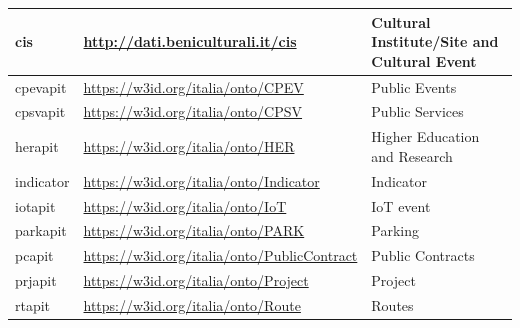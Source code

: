\begin{longtable}[c]{lll}
  \multicolumn{1}{|p{0.2\textwidth}|}{cis}           & \multicolumn{1}{p{0.4\textwidth}|}{\url{http://dati.beniculturali.it/cis}}              & \multicolumn{1}{p{0.4\textwidth}|}{Cultural Institute/Site and Cultural Event} \\ \hline
  \multicolumn{1}{|p{0.2\textwidth}|}{cpevapit}      & \multicolumn{1}{p{0.4\textwidth}|}{\url{https://w3id.org/italia/onto/CPEV}}             & \multicolumn{1}{p{0.4\textwidth}|}{Public Events}                              \\ \hline
  \multicolumn{1}{|p{0.2\textwidth}|}{cpsvapit}      & \multicolumn{1}{p{0.4\textwidth}|}{\url{https://w3id.org/italia/onto/CPSV}}             & \multicolumn{1}{p{0.4\textwidth}|}{Public Services}                            \\ \hline
  \multicolumn{1}{|p{0.2\textwidth}|}{herapit}       & \multicolumn{1}{p{0.4\textwidth}|}{\url{https://w3id.org/italia/onto/HER}}              & \multicolumn{1}{p{0.4\textwidth}|}{Higher Education and Research}              \\ \hline
  \multicolumn{1}{|p{0.2\textwidth}|}{indicator}     & \multicolumn{1}{p{0.4\textwidth}|}{\url{https://w3id.org/italia/onto/Indicator}}        & \multicolumn{1}{p{0.4\textwidth}|}{Indicator}                                  \\ \hline
  \multicolumn{1}{|p{0.2\textwidth}|}{iotapit}       & \multicolumn{1}{p{0.4\textwidth}|}{\url{https://w3id.org/italia/onto/IoT}}              & \multicolumn{1}{p{0.4\textwidth}|}{IoT event}                                  \\ \hline
  \multicolumn{1}{|p{0.2\textwidth}|}{parkapit}      & \multicolumn{1}{p{0.4\textwidth}|}{\url{https://w3id.org/italia/onto/PARK}}             & \multicolumn{1}{p{0.4\textwidth}|}{Parking}                                    \\ \hline
  \multicolumn{1}{|p{0.2\textwidth}|}{pcapit}        & \multicolumn{1}{p{0.4\textwidth}|}{\url{https://w3id.org/italia/onto/PublicContract}}   & \multicolumn{1}{p{0.4\textwidth}|}{Public Contracts}                           \\ \hline
  \multicolumn{1}{|p{0.2\textwidth}|}{prjapit}       & \multicolumn{1}{p{0.4\textwidth}|}{\url{https://w3id.org/italia/onto/Project}}          & \multicolumn{1}{p{0.4\textwidth}|}{Project}                                    \\ \hline
  \multicolumn{1}{|p{0.2\textwidth}|}{rtapit}        & \multicolumn{1}{p{0.4\textwidth}|}{\url{https://w3id.org/italia/onto/Route}}            & \multicolumn{1}{p{0.4\textwidth}|}{Routes}                                     \\ \hline

\end{longtable}
